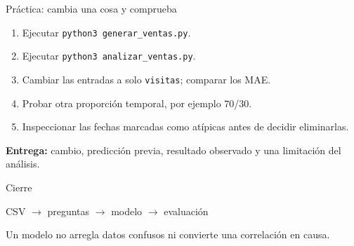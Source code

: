 \documentclass[aspectratio=169,11pt]{beamer}
\begin{document}
\begin{frame}{Práctica: cambia una cosa y comprueba}
  \begin{enumerate}
    \item Ejecutar \texttt{python3 generar\_ventas.py}.
    \item Ejecutar \texttt{python3 analizar\_ventas.py}.
    \item Cambiar las entradas a solo \texttt{visitas}; comparar los MAE.
    \item Probar otra proporción temporal, por ejemplo 70/30.
    \item Inspeccionar las fechas marcadas como atípicas antes de decidir eliminarlas.
  \end{enumerate}
  \vfill
  \textbf{Entrega:} cambio, predicción previa, resultado observado y una limitación del análisis.
\end{frame}

\begin{frame}{Cierre}
  \begin{center}
    \Large CSV $\rightarrow$ preguntas $\rightarrow$ modelo $\rightarrow$ evaluación
  \end{center}
  \vfill
  \centering
  Un modelo no arregla datos confusos ni convierte una correlación en causa.
\end{frame}
\end{document}
